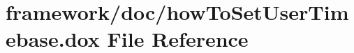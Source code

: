 \hypertarget{how_to_set_user_timebase_8dox}{}\section{framework/doc/how\+To\+Set\+User\+Timebase.dox File Reference}
\label{how_to_set_user_timebase_8dox}
